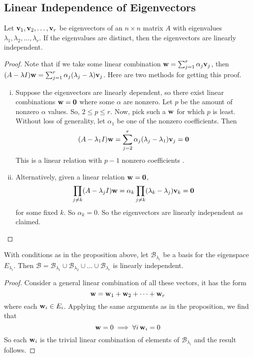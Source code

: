 \subsection{Linear Independence of Eigenvectors}
\begin{proposition}
	Let $\vb v_1, \vb v_2, \dots, \vb v_r$ be eigenvectors of an $n\times n$ matrix $A$ with eigenvalues $\lambda_1, \lambda_2,\dots,\lambda_r$. If the eigenvalues are distinct, then the eigenvectors are linearly independent.
\end{proposition}
\begin{proof}
	Note that if we take some linear combination $\vb w = \sum_{j=1}^r \alpha_j\vb v_j$, then $(A - \lambda I)\vb w = \sum_{j=1}^r \alpha_j(\lambda_j - \lambda)\vb v_j$. Here are two methods for getting this proof.
	\begin{enumerate}[(i)]
		\item Suppose the eigenvectors are linearly dependent, so there exist linear combinations $\vb w = \vb 0$ where some $\alpha$ are nonzero. Let $p$ be the amount of nonzero $\alpha$ values. So, $2 \leq p \leq r$. Now, pick such a $\vb w$ for which $p$ is least. Without loss of generality, let $\alpha_1$ be one of the nonzero coefficients. Then
		      \[ (A - \lambda_1 I)\vb w = \sum_{j=2}^r \alpha_j(\lambda_j - \lambda_1)\vb v_j = \vb 0 \]
		      This is a linear relation with $p-1$ nonzero coefficients \contradiction.
		\item Alternatively, given a linear relation $\vb w=\vb 0$,
		      \[ \prod_{j \neq k} (A - \lambda_j I) \vb w = \alpha_k \prod_{j \neq k} (\lambda_k - \lambda_j) \vb v_k = \vb 0 \]
		      for some fixed $k$. So $\alpha_k = 0$. So the eigenvectors are linearly independent as claimed.
	\end{enumerate}
\end{proof}
\begin{corollary}
	With conditions as in the proposition above, let $\mathcal B_{\lambda_i}$ be a basis for the eigenspace $E_{\lambda_i}$. Then $\mathcal B = \mathcal B_{\lambda_1} \cup \mathcal B_{\lambda_2} \cup \dots \cup \mathcal B_{\lambda_r}$ is linearly independent.
\end{corollary}
\begin{proof}
	Consider a general linear combination of all these vectors, it has the form
	\[ \vb w = \vb w_1 + \vb w_2 + \dots + \vb w_r \]
	where each $\vb w_i \in E_i$. Applying the same arguments as in the proposition, we find that
	\[ \vb w = 0 \implies \forall i\,\vb w_i = 0 \]
	So each $\vb w_i$ is the trivial linear combination of elements of $\mathcal B_{\lambda_i}$ and the result follows.
\end{proof}

